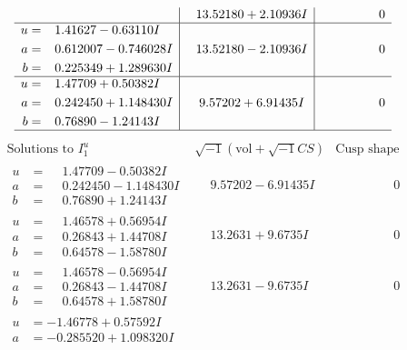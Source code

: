 \documentclass[1p]{elsarticle_modified}
\theoremstyle{definition}
\newcommand{\I}{\sqrt{-1}}
\begin{document}
$$\begin{array}{c|c|c}
 & \phantom{-}13.52180 + 2.10936 I & \phantom{-0.000000 } 0 \\ \hline\begin{aligned}
u &= \phantom{-}1.41627 - 0.63110 I \\
a &= \phantom{-}0.612007 - 0.746028 I \\
b &= \phantom{-}0.225349 + 1.289630 I\end{aligned}
 & \phantom{-}13.52180 - 2.10936 I & \phantom{-0.000000 } 0 \\ \hline\begin{aligned}
u &= \phantom{-}1.47709 + 0.50382 I \\
a &= \phantom{-}0.242450 + 1.148430 I \\
b &= \phantom{-}0.76890 - 1.24143 I\end{aligned}
 & \phantom{-}9.57202 + 6.91435 I & \phantom{-0.000000 } 0\\
 \hline 
 \end{array}$$\newpage$$\begin{array}{c|c|c}  
\text{Solutions to }I^u_{1}& \I (\text{vol} + \sqrt{-1}CS) & \text{Cusp shape}\\
 \hline 
\begin{aligned}
u &= \phantom{-}1.47709 - 0.50382 I \\
a &= \phantom{-}0.242450 - 1.148430 I \\
b &= \phantom{-}0.76890 + 1.24143 I\end{aligned}
 & \phantom{-}9.57202 - 6.91435 I & \phantom{-0.000000 } 0 \\ \hline\begin{aligned}
u &= \phantom{-}1.46578 + 0.56954 I \\
a &= \phantom{-}0.26843 + 1.44708 I \\
b &= \phantom{-}0.64578 - 1.58780 I\end{aligned}
 & \phantom{-}13.2631 + 9.6735 I & \phantom{-0.000000 } 0 \\ \hline\begin{aligned}
u &= \phantom{-}1.46578 - 0.56954 I \\
a &= \phantom{-}0.26843 - 1.44708 I \\
b &= \phantom{-}0.64578 + 1.58780 I\end{aligned}
 & \phantom{-}13.2631 - 9.6735 I & \phantom{-0.000000 } 0 \\ \hline\begin{aligned}
u &= -1.46778 + 0.57592 I \\
a &= -0.285520 + 1.098320 I \\

\end{aligned}
\end{array}$$
\end{document}
